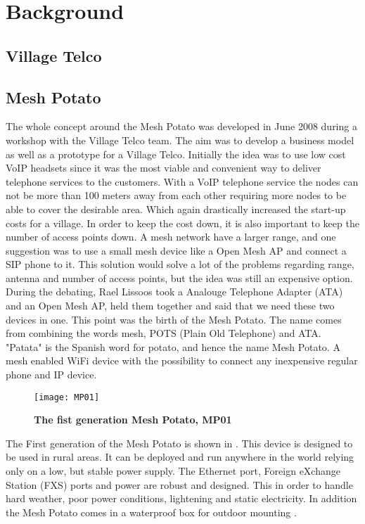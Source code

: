\chapter{Background}
\label{chp:background} 

\section{Village Telco}

\section{Mesh Potato}



The whole concept around the Mesh Potato was developed in June 2008 during a workshop with the Village Telco team. The aim was to develop a business model as well as a prototype for a Village Telco. Initially the idea was to use low cost VoIP headsets since it was the most viable and convenient way to deliver telephone services to the customers. With a VoIP telephone service the nodes can not be more than 100 meters away from each other requiring more nodes to be able to cover the desirable area. Which again drastically increased the start-up costs for a village. In order to keep the cost down, it is also important to keep the number of access points down. A mesh network have a larger range, and one suggestion was to use a small mesh device like a Open Mesh AP and connect a SIP phone to it. This solution would solve a lot of the problems regarding range, antenna and number of access points, but the idea was still an expensive option. During the debating, Rael Lissoos took a Analouge Telephone Adapter (ATA) and an Open Mesh AP, held them together and said that we need these two devices in one. This point was the birth of the Mesh Potato. The name comes from combining the words mesh, POTS (Plain Old Telephone) and ATA. "Patata" is the Spanish word for potato, and hence the name Mesh Potato. A mesh enabled WiFi device with the possibility to connect any inexpensive regular phone and IP device. \cite{MPorigin}

\begin{figure}[h!]
  \centering
      \texttt{[image: MP01]}
  \caption [The Mesh Potato]{\textbf{The fist generation Mesh Potato, MP01}}
  \label{fig:MP01}
\end{figure}

The First generation of the Mesh Potato is shown in . This device is designed to be used in rural areas. It can be deployed and run anywhere in the world relying only on a low, but stable power supply. The Ethernet port, Foreign eXchange Station (FXS) ports and power are robust and designed. This in order to handle hard weather, poor power conditions, lightening and static electricity. In addition the Mesh Potato comes in a waterproof box for outdoor mounting \cite{background}.

